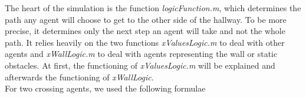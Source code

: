
The heart of the simulation is the function \textit{logicFunction.m}, which determines the path any agent will choose to get to the other side of the hallway. To be more precise, it determines only the next step an agent will take and not the whole path. It relies heavily on the two functions \textit{xValuesLogic.m} to deal with other agents and \textit{xWallLogic.m} to deal with agents representing the wall or static obstacles. At first, the functioning of \textit{xValuesLogic.m} will be explained and afterwards the functioning of \textit{xWallLogic}.\\

\noi For two crossing agents, we used the following formulae


